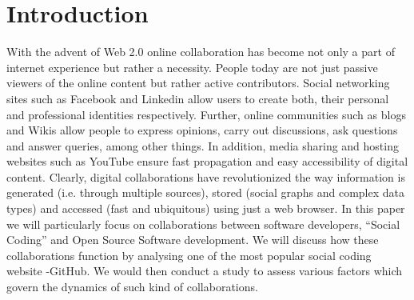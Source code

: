 
\section{Introduction}

With the advent of Web 2.0 online collaboration has become not only a part of internet experience but rather a necessity. People today are not just passive viewers of the online content but rather active contributors. Social networking sites such as Facebook and Linkedin allow users to create both, their personal and professional identities respectively. Further, online communities such as blogs and Wikis allow people to express opinions, carry out discussions, ask questions and answer queries, among other things. In addition, media sharing and hosting websites such as YouTube ensure fast propagation and easy accessibility of digital content. Clearly, digital collaborations have revolutionized the way information is generated (i.e. through multiple sources), stored (social graphs and complex data types) and accessed (fast and ubiquitous) using just a web browser. In this paper we will particularly focus on collaborations between software developers, “Social Coding” and Open Source Software development. We will discuss how these collaborations function by analysing one of the most popular social coding website -GitHub. We would then conduct a study to assess various factors which govern the dynamics of such kind of collaborations.

